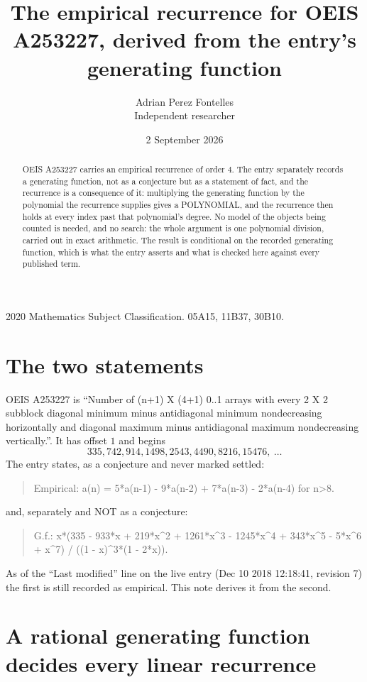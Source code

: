 \documentclass[11pt,a4paper]{article}
\title{The empirical recurrence for OEIS A253227, derived from the entry's generating function}
\author{Adrian Perez Fontelles\\ \small Independent researcher}
\date{2 September 2026}
\theoremstyle{plain}
\theoremstyle{definition}
\begin{document}
\maketitle

\begin{abstract}
OEIS A253227 carries an empirical recurrence of order $4$. The entry separately records a
generating function, not as a conjecture but as a statement of fact, and the recurrence is a
consequence of it: multiplying the generating function by the polynomial the recurrence
supplies gives a POLYNOMIAL, and the recurrence then holds at every index past that
polynomial's degree. No model of the objects being counted is needed, and no search: the
whole argument is one polynomial division, carried out in exact arithmetic. The result is
conditional on the recorded generating function, which is what the entry asserts and what is
checked here against every published term.
\end{abstract}

\noindent\small 2020 Mathematics Subject Classification. 05A15, 11B37, 30B10.\normalsize

\section{The two statements}

OEIS A253227 is ``Number of (n+1) X (4+1) 0..1 arrays with every 2 X 2 subblock diagonal minimum minus antidiagonal minimum nondecreasing horizontally and diagonal maximum minus antidiagonal maximum nondecreasing vertically.''. It has offset $1$ and begins
\[
335, 742, 914, 1498, 2543, 4490, 8216, 15476,\ \dots
\]
The entry states, as a conjecture and never marked settled:
\begin{quote}
Empirical: a(n) = 5*a(n-1) - 9*a(n-2) + 7*a(n-3) - 2*a(n-4) for n>8.
\end{quote}
and, separately and NOT as a conjecture:
\begin{quote}
G.f.: x*(335 - 933*x + 219*x\^{}2 + 1261*x\^{}3 - 1245*x\^{}4 + 343*x\^{}5 - 5*x\^{}6 + x\^{}7) / ((1 - x)\^{}3*(1 - 2*x)).
\end{quote}
As of the ``Last modified'' line on the live entry (Dec 10 2018 12:18:41, revision 7) the first is still
recorded as empirical. This note derives it from the second.

\section{A rational generating function decides every linear recurrence}
\end{document}
